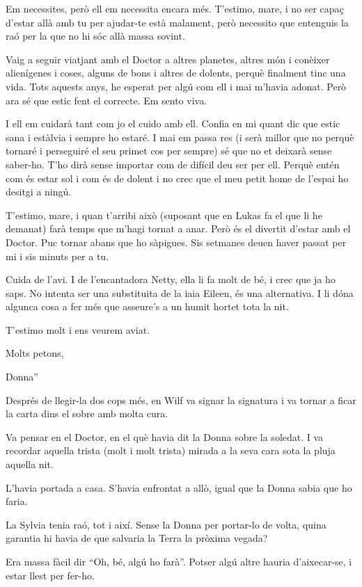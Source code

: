 Em necessites, però ell em necessita encara més. T'estimo, mare, i no
ser capaç d'estar allà amb tu per ajudar-te està malament, però
necessito que entenguis la raó per la que no hi sóc allà massa sovint.

Vaig a seguir viatjant amb el Doctor a altres planetes, altres món i
conèixer alienígenes i coses, alguns de bons i altres de dolents, perquè
finalment tinc una vida. Tots aquests anys, he esperat per algú com ell
i mai m'havia adonat. Però ara sé que estic fent el correcte. Em sento
viva.

I ell em cuidarà tant com jo el cuido amb ell. Confia en mi quant dic
que estic sana i estàlvia i sempre ho estaré. I mai em passa res (i serà
millor que no perquè tornaré i perseguiré el seu primet cos per sempre)
sé que no et deixarà sense saber-ho. T'ho dirà sense importar com de
difícil deu ser per ell. Perquè entén com és estar sol i com és de
dolent i no crec que el meu petit home de l'espai ho desitgi a ningú.

T'estimo, mare, i quan t'arribi això (suposant que en Lukas fa el que li
he demanat) farà temps que m'hagi tornat a anar. Però és el divertit
d'estar amb el Doctor. Puc tornar abans que ho sàpigues. Sis setmanes
deuen haver passat per mi i sis minuts per a tu.

Cuida de l'avi. I de l'encantadora Netty, ella li fa molt de bé, i crec
que ja ho saps. No intenta ser una substituita de la iaia Eileen, és una
alternativa. I li dóna algunca cosa a fer més que asseure's a un humit
hortet tota la nit.

T'estimo molt i ens veurem aviat.

Molts petons,

Donna''

Després de llegir-la dos cops més, en Wilf va signar la signatura i va
tornar a ficar la carta dins el sobre amb molta cura.

Va pensar en el Doctor, en el què havia dit la Donna sobre la soledat. I
va recordar aquella trista (molt i molt trista) mirada a la seva cara
sota la pluja aquella nit.

L'havia portada a casa. S'havia enfrontat a allò, igual que la Donna
sabia que ho faria.

La Sylvia tenia raó, tot i així. Sense la Donna per portar-lo de volta,
quina garantia hi havia de que salvaria la Terra la pròxima vegada?

Era massa fàcil dir ``Oh, bé, algú ho farà''. Potser algú altre hauria
d'aixecar-se, i estar llest per fer-ho.

